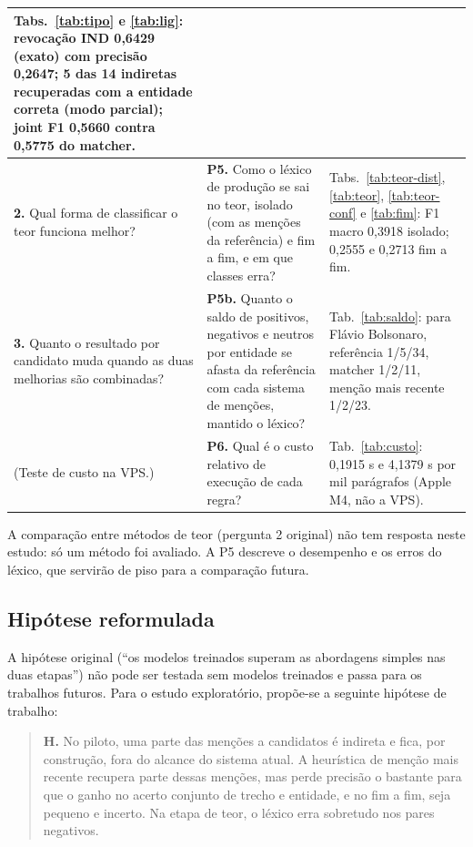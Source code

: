 \documentclass[11pt,a4paper]{article}
\begin{document}
\begin{small}
\begin{longtable}{@{}P{4.2cm}P{6.0cm}P{5.2cm}@{}}
Tabs.~\ref{tab:tipo} e \ref{tab:lig}: revocação IND 0,6429 (exato) com precisão 0,2647; 5 das 14 indiretas recuperadas com a entidade correta (modo parcial); joint F1 0,5660 contra 0,5775 do matcher. \\
\midrule
\textbf{2.} Qual forma de classificar o teor funciona melhor? &
\textbf{P5.} Como o léxico de produção se sai no teor, isolado (com as menções da referência) e fim a fim, e em que classes erra? &
Tabs.~\ref{tab:teor-dist}, \ref{tab:teor}, \ref{tab:teor-conf} e \ref{tab:fim}: F1 macro 0,3918 isolado; 0,2555 e 0,2713 fim a fim. \\
\midrule
\textbf{3.} Quanto o resultado por candidato muda quando as duas melhorias são combinadas? &
\textbf{P5b.} Quanto o saldo de positivos, negativos e neutros por entidade se afasta da referência com cada sistema de menções, mantido o léxico? &
Tab.~\ref{tab:saldo}: para Flávio Bolsonaro, referência 1/5/34, matcher 1/2/11, menção mais recente 1/2/23. \\
\midrule
{}(Teste de custo na VPS.) &
\textbf{P6.} Qual é o custo relativo de execução de cada regra? &
Tab.~\ref{tab:custo}: 0,1915 s e 4,1379 s por mil parágrafos (Apple M4, não a VPS). \\
\end{longtable}
\end{small}

A comparação entre métodos de teor (pergunta 2 original) não tem resposta neste estudo: só um método foi avaliado. A P5 descreve o desempenho e os erros do léxico, que servirão de piso para a comparação futura.

\subsection{Hipótese reformulada}

A hipótese original (\enquote{os modelos treinados superam as abordagens simples nas duas etapas}) não pode ser testada sem modelos treinados e passa para os trabalhos futuros. Para o estudo exploratório, propõe-se a seguinte hipótese de trabalho:

\begin{quote}
\textbf{H.} No piloto, uma parte das menções a candidatos é indireta e fica, por construção, fora do alcance do sistema atual. A heurística de menção mais recente recupera parte dessas menções, mas perde precisão o bastante para que o ganho no acerto conjunto de trecho e entidade, e no fim a fim, seja pequeno e incerto. Na etapa de teor, o léxico erra sobretudo nos pares negativos.
\end{quote}
\end{document}
